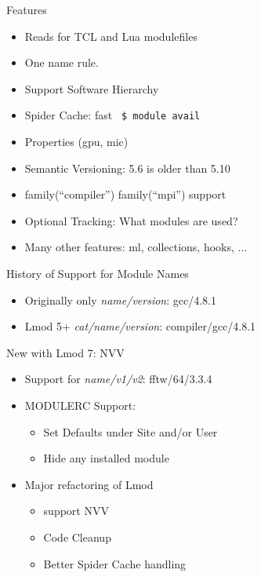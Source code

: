 \documentclass{beamer}
\begin{document}
\begin{frame}{Features}
  \begin{itemize}
    \item Reads for TCL and Lua modulefiles
    \item One name rule.
    \item Support Software Hierarchy
    \item Spider Cache: fast \texttt{\color{blue} \$ module avail}
    \item Properties (gpu, mic)
    \item Semantic Versioning:  5.6 is older than 5.10
    \item family(``compiler'') family(``mpi'') support
    \item Optional Tracking: What modules are used?
    \item Many other features: ml, collections, hooks, ...
  \end{itemize}
\end{frame}

\begin{frame}{History of Support for Module Names}
  \begin{itemize}
    \item Originally only \emph{name/version}:  gcc/4.8.1
    \item Lmod 5+ \emph{cat/name/version}:  compiler/gcc/4.8.1
  \end{itemize}
\end{frame}

\begin{frame}{New with Lmod 7: NVV}
  \begin{itemize}
    \item Support for \emph{name/v1/v2}:  fftw/64/3.3.4
    \item MODULERC Support:
      \begin{itemize}
        \item Set Defaults under Site and/or User
        \item Hide any installed module
      \end{itemize}
    \item Major refactoring of Lmod 
      \begin{itemize}
        \item support NVV
        \item Code Cleanup
        \item Better Spider Cache handling
      \end{itemize}
  \end{itemize}
\end{frame}
\end{document}
